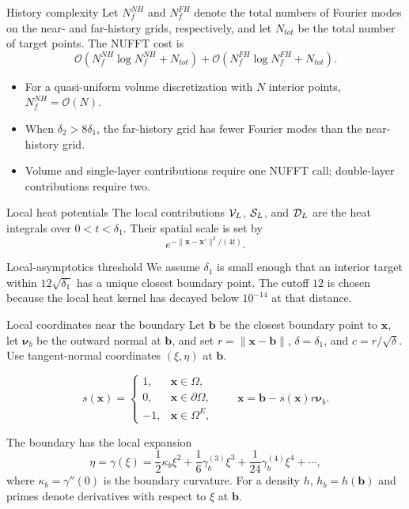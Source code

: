 \documentclass[aspectratio=169,11pt]{beamer}
\newcommand{\cO}{\mathcal{O}}
\newcommand{\x}{\bm{x}}
\newcommand{\xp}{\bm{x}'}
\newcommand{\nuvec}{\bm{\nu}}
\begin{document}
\begin{frame}{History complexity}
\small
Let $N_f^{NH}$ and $N_f^{FH}$ denote the total numbers of Fourier modes on
the near- and far-history grids, respectively, and let $N_{tot}$ be the total
number of target points.  The NUFFT cost is
\[
  \cO\!\left(N_f^{NH}\log N_f^{NH}+N_{tot}\right)
  +
  \cO\!\left(N_f^{FH}\log N_f^{FH}+N_{tot}\right).
\]

\begin{itemize}
  \item For a quasi-uniform volume discretization with $N$ interior points,
  $N_f^{NH}=\cO(N)$.
  \item When $\delta_2>8\delta_1$, the far-history grid has fewer Fourier
  modes than the near-history grid.
  \item Volume and single-layer contributions require one NUFFT call;
  double-layer contributions require two.
\end{itemize}
\end{frame}

\begin{frame}{Local heat potentials}
\small
The local contributions $\mathcal{V}_L$, $\mathcal{S}_L$, and $\mathcal{D}_L$ are the heat
integrals over $0<t<\delta_1$.  Their spatial scale is set by
\[
  e^{-\|\x-\xp\|^2/(4t)}.
\]

\begin{block}{Local-asymptotics threshold}
We assume $\delta_1$ is small enough that an interior target within
$12\sqrt{\delta_1}$ has a unique closest boundary point. The cutoff $12$ is
chosen because the local heat kernel has decayed below $10^{-14}$ at that
distance.
\end{block}
\end{frame}

\begin{frame}{Local coordinates near the boundary}
\small
Let $\bm b$ be the closest boundary point to $\x$, let $\nuvec_b$ be the
outward normal at $\bm b$, and set $r=\|\x-\bm b\|$, $\delta=\delta_1$,
and $c=r/\sqrt\delta$.  Use tangent-normal coordinates $(\xi,\eta)$ at
$\bm b$.

\[
  s(\x)=
  \begin{cases}
  1,&\x\in\Omega,\\
  0,&\x\in\partial\Omega,\\
  -1,&\x\in\Omega^E,
  \end{cases}
  \qquad
  \x=\bm b-s(\x)r\nuvec_b.
\]

The boundary has the local expansion
\[
  \eta=\gamma(\xi)
  =
  \frac12\kappa_b\xi^2
  +
  \frac16\gamma_b^{(3)}\xi^3
  +
  \frac1{24}\gamma_b^{(4)}\xi^4+\cdots,
\]
where $\kappa_b=\gamma''(0)$ is the boundary curvature.  For a density $h$,
$h_b=h(\bm b)$ and primes denote derivatives with respect to $\xi$ at $\bm b$.
\end{frame}
\end{document}
